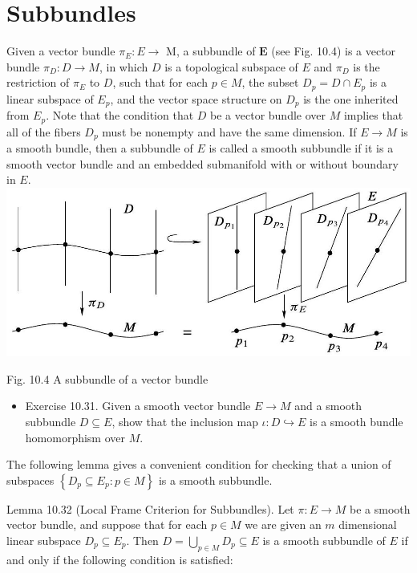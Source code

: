 \documentclass[10pt]{article}
\begin{document}
\section*{Subbundles}
Given a vector bundle $\pi_{E}: E \rightarrow$ M, a subbundle of $\boldsymbol{E}$ (see Fig. 10.4) is a vector bundle $\pi_{D}: D \rightarrow M$, in which $D$ is a topological subspace of $E$ and $\pi_{D}$ is the restriction of $\pi_{E}$ to $D$, such that for each $p \in M$, the subset $D_{p}=D \cap E_{p}$ is a linear subspace of $E_{p}$, and the vector space structure on $D_{p}$ is the one inherited from $E_{p}$. Note that the condition that $D$ be a vector bundle over $M$ implies that all of the fibers $D_{p}$ must be nonempty and have the same dimension. If $E \rightarrow M$ is a smooth bundle, then a subbundle of $E$ is called a smooth subbundle if it is a smooth vector bundle and an embedded submanifold with or without boundary in $E$.\\
\includegraphics[max width=\textwidth, center]{2025_06_03_90f64b1a1e243cccc2e0g-283}

Fig. 10.4 A subbundle of a vector bundle

\begin{itemize}
  \item Exercise 10.31. Given a smooth vector bundle $E \rightarrow M$ and a smooth subbundle $D \subseteq E$, show that the inclusion map $\iota: D \hookrightarrow E$ is a smooth bundle homomorphism over $M$.
\end{itemize}

The following lemma gives a convenient condition for checking that a union of subspaces $\left\{D_{p} \subseteq E_{p}: p \in M\right\}$ is a smooth subbundle.

Lemma 10.32 (Local Frame Criterion for Subbundles). Let $\pi: E \rightarrow M$ be a smooth vector bundle, and suppose that for each $p \in M$ we are given an $m$ dimensional linear subspace $D_{p} \subseteq E_{p}$. Then $D=\bigcup_{p \in M} D_{p} \subseteq E$ is a smooth subbundle of $E$ if and only if the following condition is satisfied:
\end{document}
